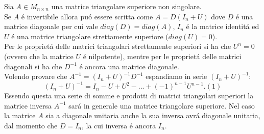 Sia $A \in M_{n \times n}$ una matrice triangolare superiore non singolare.\\
Se $A$ \'e invertibile allora pu\'o essere scritta come $A=D(\mathit{I_n}+U)$ dove $D$ \'e una matrice diagonale per cui vale $diag(D)=diag(A)$, $\mathit{I_n}$ \'e la matrice identit\'a ed $U$ \'e una matrice triangolare strettamente superiore ($diag(U)=0$).\\
Per le propriet\'a delle matrici triangolari strettamente superiori si ha che $U^n = 0$ (ovvero che la matrice $U$ \'e nilpotente), mentre per le propriet\'a delle matrici diagonali si ha che $D^{-1}$ \'e ancora una matrice diagonale.
\\
Volendo provare che $A^{-1}=(\mathit{I_n}+U)^{-1}D^{-1}$ espandiamo in serie $ (\mathit{I_n}+U)^{-1}$:
\[
(\mathit{I_n}+U)^{-1}=\mathit{I_n}-U+U^2-...+(-1)^{n-1}U^{n-1}. (1)
\]
Essendo questa una serie di somme e prodotti di matrici triangolari superiori la matrice inversa $A^{-1}$ sar\'a in generale una matrice triangolare superiore.
Nel caso la matrice $A$ sia a diagonale unitaria anche la sua inversa avr\'a diagonale unitaria, dal momento che $D = I_n$, la cui inversa \'e ancora $I_n$.
